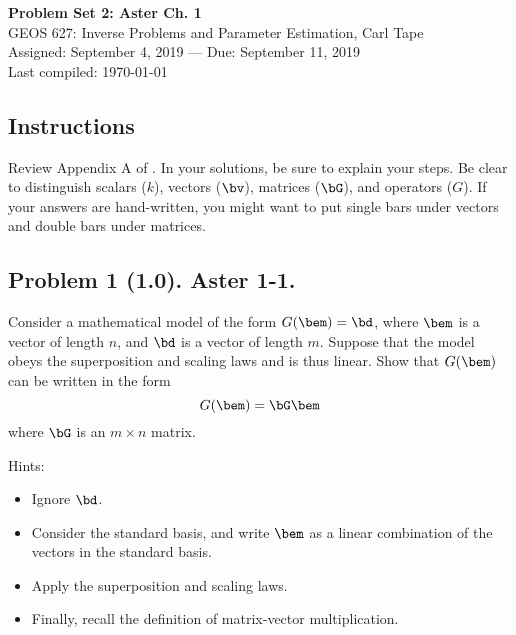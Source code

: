 \documentclass[11pt,titlepage,fleqn]{article}
\begin{document}

\begin{spacing}{1.2}
\centering
{\large \bf Problem Set 2: Aster Ch. 1} \\
GEOS 627: Inverse Problems and Parameter Estimation, Carl Tape \\
Assigned: September 4, 2019 --- Due: September 11, 2019 \\
Last compiled: \today
\end{spacing}


\subsection*{Instructions}

Review Appendix A of \citet{AsterE2}. In your solutions, be sure to explain your steps. Be clear to distinguish scalars ($k$), vectors ($\bv$), matrices ($\bG$), and operators ($G$). If your answers are hand-written, you might want to put single bars under vectors and double bars under matrices.

\subsection*{Problem 1 (1.0). Aster 1-1.}

Consider a mathematical model of the form $G(\bem) = \bd$, where $\bem$ is a vector of length $n$, and $\bd$ is a vector of length $m$. Suppose that the model obeys the superposition and scaling laws and is thus linear. Show that $G(\bem)$ can be written in the form
%
\begin{equation}
G(\bem) = \bG\bem
\end{equation}
%
where $\bG$ is an $m \times n$ matrix.

\medskip\noindent
Hints:
%
\begin{itemize}
\item Ignore $\bd$.
\item Consider the standard basis, and write $\bem$ as a linear combination of the vectors in the standard basis.
\item Apply the superposition and scaling laws.
\item Finally, recall the definition of matrix-vector multiplication.
\end{itemize}

\end{document}
